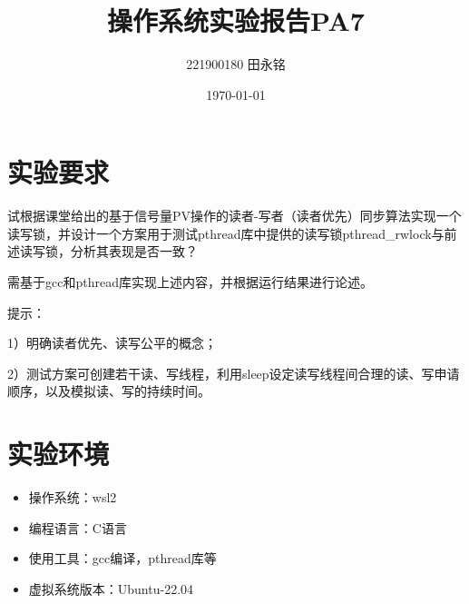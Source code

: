 \documentclass{LabReport}
\title{操作系统实验报告PA7}
\author{221900180 田永铭}
\date{\today}
\begin{document}
	\maketitle
	
	\tableofcontents
	
	\newpage
	
	\section{实验要求}
试根据课堂给出的基于信号量PV操作的读者-写者（读者优先）同步算法实现一个读写锁，并设计一个方案用于测试pthread库中提供的读写锁pthread\_rwlock与前述读写锁，分析其表现是否一致？\par
\hspace{0em}需基于gcc和pthread库实现上述内容，并根据运行结果进行论述。\par
\hspace{0em}提示：\par\hspace{0em}
1）明确读者优先、读写公平的概念；\par\hspace{0em}
2）测试方案可创建若干读、写线程，利用sleep设定读写线程间合理的读、写申请顺序，以及模拟读、写的持续时间。

	\section{实验环境}
	
	\begin{itemize}
		\item 操作系统：wsl2
		\item 编程语言：C语言
		\item 使用工具：gcc编译，pthread库等
		\item 虚拟系统版本：Ubuntu-22.04
	\end{itemize}
	
\end{document}
